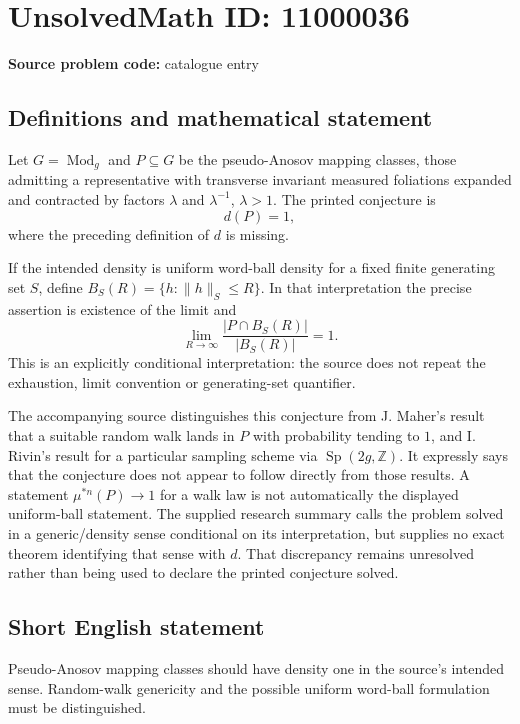 \documentclass[11pt]{article}
\newcommand{\Z}{\mathbb{Z}}
\begin{document}
\section*{UnsolvedMath ID: 11000036}
\textbf{Source problem code:} catalogue entry
\subsection{Definitions and mathematical statement}
Let \(G=\operatorname{Mod}_g\) and \(P\subseteq G\) be the pseudo-Anosov mapping classes, those admitting a representative with transverse invariant measured foliations expanded and contracted by factors \(\lambda\) and \(\lambda^{-1}\), \(\lambda>1\). The printed conjecture is
\[
 d(P)=1,
\]
where the preceding definition of \(d\) is missing.

If the intended density is uniform word-ball density for a fixed finite generating set \(S\), define \(B_S(R)=\{h:\|h\|_S\leq R\}\). In that interpretation the precise assertion is existence of the limit and
\[
 \lim_{R\to\infty}\frac{|P\cap B_S(R)|}{|B_S(R)|}=1.
\]
This is an explicitly conditional interpretation: the source does not repeat the exhaustion, limit convention or generating-set quantifier.

The accompanying source distinguishes this conjecture from J. Maher's result that a suitable random walk lands in \(P\) with probability tending to \(1\), and I. Rivin's result for a particular sampling scheme via \(\operatorname{Sp}(2g,\Z)\). It expressly says that the conjecture does not appear to follow directly from those results. A statement \(\mu^{*n}(P)\to1\) for a walk law is not automatically the displayed uniform-ball statement. The supplied research summary calls the problem solved in a generic/density sense conditional on its interpretation, but supplies no exact theorem identifying that sense with \(d\). That discrepancy remains unresolved rather than being used to declare the printed conjecture solved.
\subsection{Short English statement}
Pseudo-Anosov mapping classes should have density one in the source's intended sense. Random-walk genericity and the possible uniform word-ball formulation must be distinguished.
\end{document}
